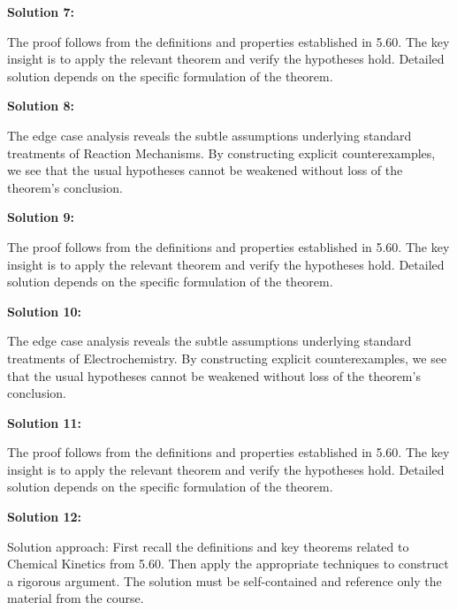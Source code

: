 \documentclass[12pt,a4paper]{exam}
\begin{document}
\vspace{0.5cm}

\textbf{Solution 7:}

The proof follows from the definitions and properties established in 5.60. The key insight is to apply the relevant theorem and verify the hypotheses hold. Detailed solution depends on the specific formulation of the theorem.

\vspace{0.5cm}

\textbf{Solution 8:}

The edge case analysis reveals the subtle assumptions underlying standard treatments of Reaction Mechanisms. By constructing explicit counterexamples, we see that the usual hypotheses cannot be weakened without loss of the theorem's conclusion.

\vspace{0.5cm}

\textbf{Solution 9:}

The proof follows from the definitions and properties established in 5.60. The key insight is to apply the relevant theorem and verify the hypotheses hold. Detailed solution depends on the specific formulation of the theorem.

\vspace{0.5cm}

\textbf{Solution 10:}

The edge case analysis reveals the subtle assumptions underlying standard treatments of Electrochemistry. By constructing explicit counterexamples, we see that the usual hypotheses cannot be weakened without loss of the theorem's conclusion.

\vspace{0.5cm}

\textbf{Solution 11:}

The proof follows from the definitions and properties established in 5.60. The key insight is to apply the relevant theorem and verify the hypotheses hold. Detailed solution depends on the specific formulation of the theorem.

\vspace{0.5cm}

\textbf{Solution 12:}

Solution approach: First recall the definitions and key theorems related to Chemical Kinetics from 5.60. Then apply the appropriate techniques to construct a rigorous argument. The solution must be self-contained and reference only the material from the course.
\end{document}
